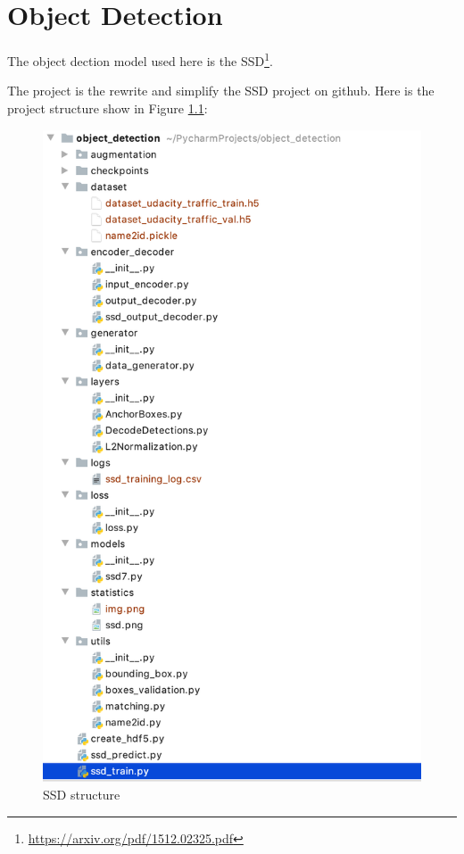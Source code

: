 
\chapter{Object Detection}

The object dection model used here is the SSD\footnote{\url{https://arxiv.org/pdf/1512.02325.pdf}}.

The project is the rewrite and simplify the SSD project on github.
Here is the project structure show in Figure \ref{fig:ssd-structure}:
\begin{figure}[!ht]
  \centering
  \includegraphics[width=\textwidth]{pics/ssd-structure}
  \caption{SSD structure}
  \label{fig:ssd-structure}
\end{figure}


